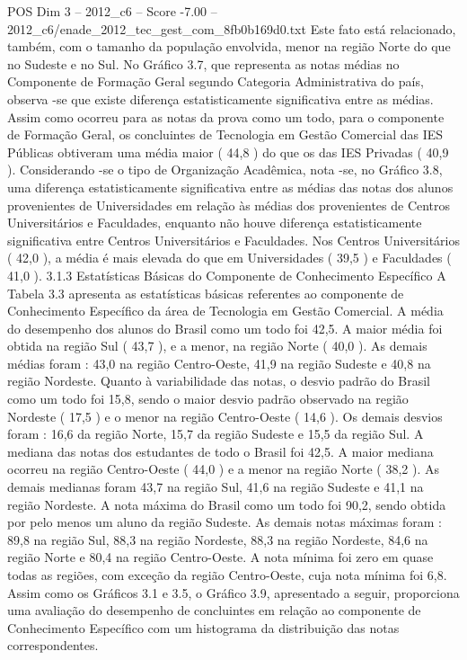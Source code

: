 \begin{textsample}{POS Dim 3 – 2012\_c6 – Score -7.00 – 2012\_c6/enade\_2012\_tec\_gest\_com\_8fb0b169d0.txt}
Este fato está relacionado, também, com o tamanho da população envolvida, menor na região Norte do que no Sudeste e no Sul.
No Gráfico 3.7, que representa as notas médias no Componente de Formação Geral segundo Categoria Administrativa do país, observa -se que existe diferença estatisticamente significativa entre as médias.
Assim como ocorreu para as notas da prova como um todo, para o componente de Formação Geral, os concluintes de Tecnologia em Gestão Comercial das IES Públicas obtiveram uma média maior ( 44,8 ) do que os das IES Privadas ( 40,9 ).
Considerando -se o tipo de Organização Acadêmica, nota -se, no Gráfico 3.8, uma diferença estatisticamente significativa entre as médias das notas dos alunos provenientes de Universidades em relação às médias dos provenientes de Centros Universitários e Faculdades, enquanto não houve diferença estatisticamente significativa entre Centros Universitários e Faculdades.
Nos Centros Universitários ( 42,0 ), a média é mais elevada do que em Universidades ( 39,5 ) e Faculdades ( 41,0 ). 3.1.3 Estatísticas Básicas do Componente de Conhecimento Específico A Tabela 3.3 apresenta as estatísticas básicas referentes ao componente de Conhecimento Específico da área de Tecnologia em Gestão Comercial.
A média do desempenho dos alunos do Brasil como um todo foi 42,5.
A maior média foi obtida na região Sul ( 43,7 ), e a menor, na região Norte ( 40,0 ).
As demais médias foram : 43,0 na região Centro-Oeste, 41,9 na região Sudeste e 40,8 na região Nordeste.
Quanto à variabilidade das notas, o desvio padrão do Brasil como um todo foi 15,8, sendo o maior desvio padrão observado na região Nordeste ( 17,5 ) e o menor na região Centro-Oeste ( 14,6 ).
Os demais desvios foram : 16,6 da região Norte, 15,7 da região Sudeste e 15,5 da região Sul.
A mediana das notas dos estudantes de todo o Brasil foi 42,5.
A maior mediana ocorreu na região Centro-Oeste ( 44,0 ) e a menor na região Norte ( 38,2 ).
As demais medianas foram 43,7 na região Sul, 41,6 na região Sudeste e 41,1 na região Nordeste.
A nota máxima do Brasil como um todo foi 90,2, sendo obtida por pelo menos um aluno da região Sudeste.
As demais notas máximas foram : 89,8 na região Sul, 88,3 na região Nordeste, 88,3 na região Nordeste, 84,6 na região Norte e 80,4 na região Centro-Oeste.
A nota mínima foi zero em quase todas as regiões, com exceção da região Centro-Oeste, cuja nota mínima foi 6,8.
Assim como os Gráficos 3.1 e 3.5, o Gráfico 3.9, apresentado a seguir, proporciona uma avaliação do desempenho de concluintes em relação ao componente de Conhecimento Específico com um histograma da distribuição das notas correspondentes.

\end{textsample}
